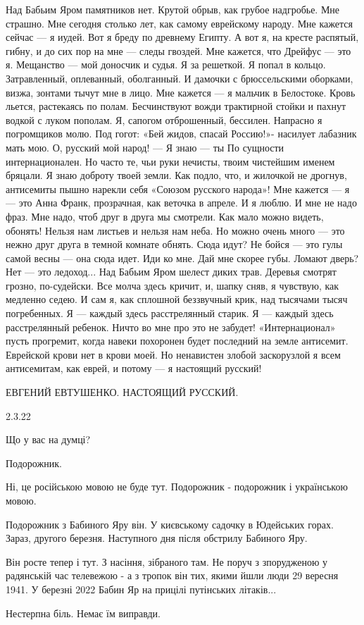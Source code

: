 \raggedcolumns
\begin{multicols}{2} %
\setlength{\parindent}{0pt}

\obeycr
Над Бабьим Яром памятников нет.
Крутой обрыв, как грубое надгробье.
Мне страшно.
Мне сегодня столько лет,
как самому еврейскому народу.
\smallskip
Мне кажется сейчас —
я иудей.
Вот я бреду по древнему Египту.
А вот я, на кресте распятый, гибну,
и до сих пор на мне — следы гвоздей.
\smallskip
Мне кажется, что Дрейфус —
это я.
Мещанство —
мой доносчик и судья.
\smallskip
Я за решеткой.
Я попал в кольцо.
Затравленный,
оплеванный,
оболганный.
\smallskip
И дамочки с брюссельскими оборками,
визжа, зонтами тычут мне в лицо.
Мне кажется —
я мальчик в Белостоке.
Кровь льется, растекаясь по полам.
\smallskip
Бесчинствуют вожди трактирной стойки
и пахнут водкой с луком пополам.
Я, сапогом отброшенный, бессилен.
Напрасно я погромщиков молю.
\smallskip
Под гогот:
«Бей жидов, спасай Россию!»-
насилует лабазник мать мою.
\smallskip
О, русский мой народ! —
Я знаю —
ты
По сущности интернационален.
\smallskip
Но часто те, чьи руки нечисты,
твоим чистейшим именем бряцали.
Я знаю доброту твоей земли.
\smallskip
Как подло,
что, и жилочкой не дрогнув,
антисемиты пышно нарекли
себя «Союзом русского народа»!
\smallskip
Мне кажется —
я — это Анна Франк,
прозрачная,
как веточка в апреле.
\smallskip
И я люблю.
И мне не надо фраз.
Мне надо,
чтоб друг в друга мы смотрели.
\smallskip
Как мало можно видеть,
обонять!
Нельзя нам листьев
и нельзя нам неба.
\smallskip
Но можно очень много —
это нежно
друг друга в темной комнате обнять.
Сюда идут?
\smallskip
Не бойся — это гулы
самой весны —
она сюда идет.
Иди ко мне.
\smallskip
Дай мне скорее губы.
Ломают дверь?
Нет — это ледоход...
Над Бабьим Яром шелест диких трав.
\smallskip
Деревья смотрят грозно,
по-судейски.
Все молча здесь кричит,
и, шапку сняв,
я чувствую,
как медленно седею.
\smallskip
И сам я,
как сплошной беззвучный крик,
над тысячами тысяч погребенных.
\smallskip
Я —
каждый здесь расстрелянный старик.
\smallskip
Я —
каждый здесь расстрелянный ребенок.
\smallskip
Ничто во мне
про это не забудет!
\smallskip
«Интернационал»
пусть прогремит,
когда навеки похоронен будет
последний на земле антисемит.
Еврейской крови нет в крови моей.
Но ненавистен злобой заскорузлой
я всем антисемитам,
как еврей,
и потому —
я настоящий русский!
\restorecr
\end{multicols} %

ЕВГЕНИЙ ЕВТУШЕНКО. НАСТОЯЩИЙ РУССКИЙ.

2.3.22

Що у вас на думці?

Подорожник.

Ні, це російською мовою не буде тут. Подорожник - подорожник і українською мовою. 

Подорожник з Бабиного Яру він. У києвському садочку в Юдейських горах. Зараз,
другого березня. Наступного дня після обстрилу Бабиного Яру.

Він росте тепер і тут. З насіння, зібраного там. Не поруч з зпорудженою у
радянській час телевежою - а з тропок він тих, якими йшли люди 29 вересня 1941.
У березні 2022 Бабин Яр на прицілі путінських літаків...

Нестерпна біль. Немає їм виправди.
